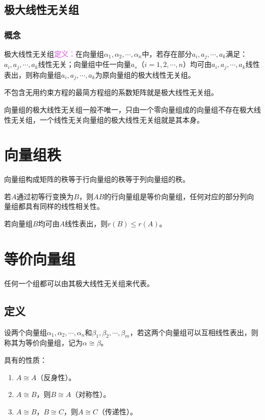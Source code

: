 \documentclass[UTF8, 12pt]{ctexart}
\begin{document}
\subsection{极大线性无关组}

\subsubsection{概念}

极大线性无关组\textcolor{violet}{\textbf{定义：}}在向量组$\alpha_1,\alpha_2,\cdots,\alpha_n$中，若存在部分$a_i,a_j,\cdots,a_k$满足：$a_i,a_j,\cdots,a_k$线性无关；向量组中任一向量$a_s$（$i=1,2,\cdots,n$）均可由$a_i,a_j,\cdots,a_k$线性表出，则称向量组$a_i,a_j,\cdots,a_k$为原向量组的极大线性无关组。

不包含无用约束方程的最简方程组的系数矩阵就是极大线性无关组。

向量组的极大线性无关组一般不唯一，只由一个零向量组成的向量组不存在极大线性无关组，一个线性无关向量组的极大线性无关组就是其本身。

\section{向量组秩}

向量组构成矩阵的秩等于行向量组的秩等于列向量组的秩。

若$A$通过初等行变换为$B$，则$AB$的行向量组是等价向量组，任何对应的部分列向量组都具有同样的线性相关性。

若向量组$B$均可由$A$线性表出，则$r(B)\leqslant r(A)$。

\section{等价向量组}

任何一个组都可以由其极大线性无关组来代表。

\subsection{定义}

设两个向量组$\alpha_1,\alpha_2,\cdots,\alpha_n$和$\beta_1,\beta_2,\cdots,\beta_m$，若这两个向量组可以互相线性表出，则称其为等价向量组，记为$\alpha\cong\beta$。

具有的性质：

\begin{enumerate}
    \item $A\cong A$（反身性）。
    \item $A\cong B$，则$B\cong A$（对称性）。
    \item $A\cong B$，$B\cong C$，则$A\cong C$（传递性）。
\end{enumerate}
\end{document}
